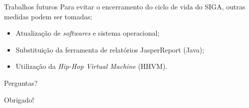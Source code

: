 \begin{frame}{Trabalhos futuros}
	Para evitar o encerramento do ciclo de vida do SIGA, outras medidas podem 
	ser tomadas;
	\begin{block}{}
		\begin{itemize}
			\item Atualização de \textit{softwares} e sistema operacional;
			\item Substituição da ferramenta de relatórios JasperReport (Java);
			\item Utilização da \textit{Hip-Hop Virtual Machine} (HHVM).
		\end{itemize}
	\end{block}
\end{frame}

\begin{frame}
	\centering
	{\Large Perguntas?}
\end{frame}

\begin{frame}
	\centering
	{\Large Obrigado!}
\end{frame}